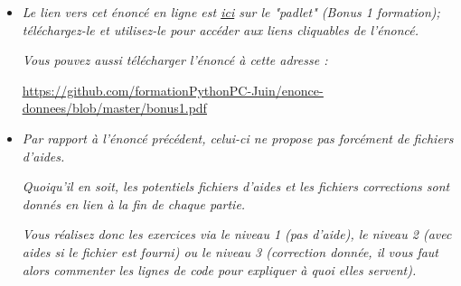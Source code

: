 \documentclass[11pt]{article}
\begin{document}
\begin{itemize}

\item \textit{Le lien vers cet énoncé en ligne est \href{https://padlet.com/laurent_astier/oat6d9azo7rs}{ici} sur le "padlet" (Bonus 1 formation); téléchargez-le et utilisez-le pour accéder aux liens cliquables de l'énoncé.}


\medskip

\textit{Vous pouvez aussi télécharger l'énoncé à cette adresse : }


\begin{center}
\underline{\url{https://github.com/formationPythonPC-Juin/enonce-donnees/blob/master/bonus1.pdf}                                                                                               }
\end{center}







\bigskip










\item \textit{Par rapport à l'énoncé précédent, celui-ci ne propose pas forcément  de fichiers d'aides.}

\medskip

\textit{Quoiqu'il en soit, les potentiels fichiers d'aides et les fichiers corrections sont donnés en lien à la fin de chaque partie.}

\medskip
\textit{Vous réalisez donc les exercices via le niveau 1 (pas d'aide), le niveau 2 (avec aides si le fichier est fourni) ou le niveau 3 (correction donnée, il vous faut alors commenter les lignes de code pour expliquer à quoi elles servent).} 








\bigskip














\end{itemize}
\end{document}
